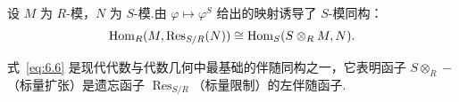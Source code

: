 \begin{theorem}\label{thm:base-ext-adjunction}
设 $M$ 为 $R$-模，$N$ 为 $S$-模.由 $\varphi \mapsto \varphi^S$ 给出的映射诱导了 $S$-模同构：
\begin{equation}
  \operatorname{Hom}_R(M, \operatorname{Res}_{S/R}(N)) \cong \operatorname{Hom}_S(S \otimes_R M, N). \label{eq:6.6}
\end{equation}
\end{theorem}

式~\eqref{eq:6.6} 是现代代数与代数几何中最基础的伴随同构之一，它表明函子 $S \otimes_R -$（标量扩张）是遗忘函子 $\operatorname{Res}_{S/R}$（标量限制）的左伴随函子.
